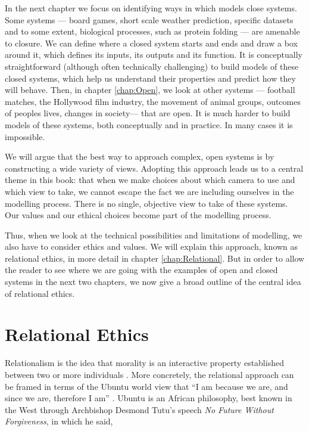 In the next chapter we focus on identifying ways in which models close systems. Some systems --- board games, short scale weather prediction, specific datasets and to some extent, biological processes, such as protein folding --- are amenable to closure. We can define where a closed system starts and ends and draw a box around it, which defines its inputs, its outputs and its function. It is conceptually straightforward (although often technically challenging) to build models of these closed systems, which help us understand their properties and predict how they will behave. Then, in chapter \ref{chap:Open}, we look at other systems --- football matches, the Hollywood film industry, the movement of animal groups, outcomes of peoples lives, changes in society--- that are open. It is much harder to build models of these systems, both conceptually and in practice. In many cases it is impossible.

We will argue that the best way to approach complex, open systems is by constructing a wide variety of views. Adopting this approach leads us to a central theme in this book: that when we make choices about which camera to use and which view to take, we cannot escape the fact we are including ourselves in the modelling process. There is no single, objective view to take of these systems. Our values and our ethical choices become part of the modelling process.

Thus, when we look at the technical possibilities and limitations of modelling, we also have to consider ethics and values. We will explain this approach, known as relational ethics, in more detail in chapter \ref{chap:Relational}. But in order to allow the reader to see where we are going with the examples of open and closed systems in the next two chapters, we now give a broad outline of the central idea of relational ethics.

\section{Relational Ethics}

\label{relational}

Relationalism is the idea that morality is an interactive property established between two or more individuals \cite{metz2016relational}. More concretely, the relational approach can be framed in terms of the Ubuntu world view that ``I am
because we are, and since we are, therefore I am'' \cite{mbiti1969african}. Ubuntu is an African philosophy, best known in the West through Archbishop Desmond Tutu’s speech {\it No Future Without Forgiveness}, in which he said, 

